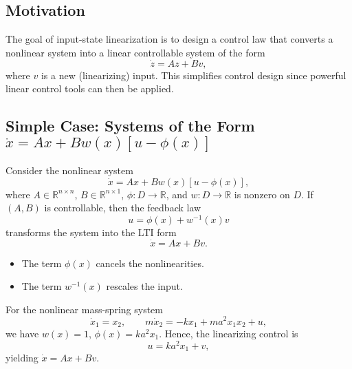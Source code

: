 \subsection{Motivation}

The goal of input-state linearization is to design a control law that converts a nonlinear system
into a linear controllable system of the form
\begin{equation}
\dot{z} = A z + B v,
\end{equation}
where $v$ is a new (linearizing) input.  
This simplifies control design since powerful linear control tools can then be applied.

\subsection{Simple Case: Systems of the Form $\dot{x} = A x + B w(x)[u - \phi(x)]$}

Consider the nonlinear system
\begin{equation}
\dot{x} = A x + B w(x)[u - \phi(x)],
\end{equation}
where $A \in \mathbb{R}^{n \times n}$, $B \in \mathbb{R}^{n \times 1}$,
$\phi : D \to \mathbb{R}$, and $w : D \to \mathbb{R}$ is nonzero on $D$.
If $(A, B)$ is controllable, then the feedback law
\begin{equation}
u = \phi(x) + w^{-1}(x) v
\end{equation}
transforms the system into the LTI form
\begin{equation}
\dot{x} = A x + B v.
\end{equation}

\begin{itemize}
    \item The term $\phi(x)$ cancels the nonlinearities.
    \item The term $w^{-1}(x)$ rescales the input.
\end{itemize}

\begin{example}[Example 10.8]
For the nonlinear mass-spring system
\begin{equation}
\dot{x}_1 = x_2, \qquad m\dot{x}_2 = -k x_1 + m a^2 x_1 x_2 + u,
\end{equation}
we have $w(x) = 1$, $\phi(x) = k a^2 x_1$.  
Hence, the linearizing control is
\begin{equation}
u = k a^2 x_1 + v,
\end{equation}
yielding $\dot{x} = A x + B v$.
\end{example}

